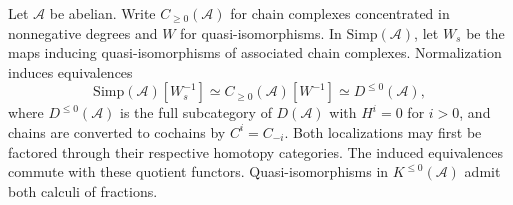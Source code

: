 \begin{lemma}
\label{lemma-illusie-I-localized-dold-kan}
Let $\mathcal A$ be abelian. Write $C_{\geq0}(\mathcal A)$ for chain
complexes concentrated in nonnegative degrees and $W$ for quasi-isomorphisms.
In $\mathrm{Simp}(\mathcal A)$, let $W_s$ be the maps inducing
quasi-isomorphisms of associated chain complexes. Normalization induces
equivalences
\[
 \mathrm{Simp}(\mathcal A)[W_s^{-1}]
 \simeq C_{\geq0}(\mathcal A)[W^{-1}]
 \simeq D^{\leq0}(\mathcal A),
\]
where $D^{\leq0}(\mathcal A)$ is the full subcategory of $D(\mathcal A)$
with $H^i=0$ for $i>0$, and chains are converted to cochains by $C^i=C_{-i}$.
Both localizations may first be factored through their respective homotopy
categories. The induced equivalences commute with these quotient functors.
Quasi-isomorphisms in $K^{\leq0}(\mathcal A)$ admit both calculi of fractions.
\end{lemma}

